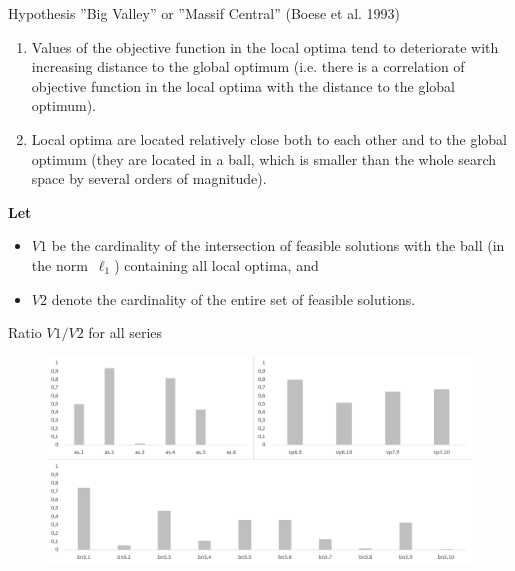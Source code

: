 \documentclass[aspectratio=169,xcolor=dvipsnames]{beamer}
\begin{document}
\begin{frame}{Hypothesis ''Big Valley'' or ''Massif Central''  (Boese et al.
1993)}
\begin{enumerate}
\item Values of the objective function in the local optima tend to deteriorate with increasing distance to the global optimum (i.e. there is a correlation 
of objective function in the local optima with the distance to the global optimum).
\vspace{0.5cm}	
\item Local optima are located relatively close both to each other and to the global optimum (they are located in a ball, which is smaller than 
the whole search space by several orders of magnitude).
\end{enumerate}

{\bf Let }
\begin{itemize}
\item $V1$ be the cardinality of the intersection of feasible solutions with the ball (in the norm~$\ell_1$) containing
all local optima, and 
\item $V2$ denote the cardinality of the entire set of feasible
solutions.
\end{itemize}
\end{frame}


\begin{frame}{Ratio $V1/V2$ for all series}
    \begin{figure}
    \includegraphics[scale=0.6]{volume}
    \end{figure}
\end{frame}

\end{document}
